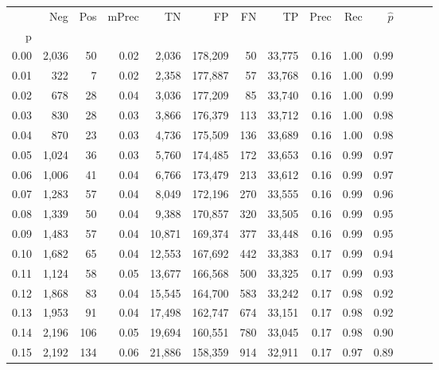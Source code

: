 \begin{tabular}{rrrrrrrrrrrrrr}
\toprule
{} &    Neg &  Pos & mPrec &       TN &       FP &      FN &      TP &  Prec &   Rec & $\hat{p}$ \\
p    &        &      &       &          &          &         &         &       &       &           \\
\midrule
0.00 &  2,036 &   50 &  0.02 &    2,036 &  178,209 &      50 &  33,775 &  0.16 &  1.00 &      0.99 \\
0.01 &    322 &    7 &  0.02 &    2,358 &  177,887 &      57 &  33,768 &  0.16 &  1.00 &      0.99 \\
0.02 &    678 &   28 &  0.04 &    3,036 &  177,209 &      85 &  33,740 &  0.16 &  1.00 &      0.99 \\
0.03 &    830 &   28 &  0.03 &    3,866 &  176,379 &     113 &  33,712 &  0.16 &  1.00 &      0.98 \\
0.04 &    870 &   23 &  0.03 &    4,736 &  175,509 &     136 &  33,689 &  0.16 &  1.00 &      0.98 \\
0.05 &  1,024 &   36 &  0.03 &    5,760 &  174,485 &     172 &  33,653 &  0.16 &  0.99 &      0.97 \\
0.06 &  1,006 &   41 &  0.04 &    6,766 &  173,479 &     213 &  33,612 &  0.16 &  0.99 &      0.97 \\
0.07 &  1,283 &   57 &  0.04 &    8,049 &  172,196 &     270 &  33,555 &  0.16 &  0.99 &      0.96 \\
0.08 &  1,339 &   50 &  0.04 &    9,388 &  170,857 &     320 &  33,505 &  0.16 &  0.99 &      0.95 \\
0.09 &  1,483 &   57 &  0.04 &   10,871 &  169,374 &     377 &  33,448 &  0.16 &  0.99 &      0.95 \\
0.10 &  1,682 &   65 &  0.04 &   12,553 &  167,692 &     442 &  33,383 &  0.17 &  0.99 &      0.94 \\
0.11 &  1,124 &   58 &  0.05 &   13,677 &  166,568 &     500 &  33,325 &  0.17 &  0.99 &      0.93 \\
0.12 &  1,868 &   83 &  0.04 &   15,545 &  164,700 &     583 &  33,242 &  0.17 &  0.98 &      0.92 \\
0.13 &  1,953 &   91 &  0.04 &   17,498 &  162,747 &     674 &  33,151 &  0.17 &  0.98 &      0.92 \\
0.14 &  2,196 &  106 &  0.05 &   19,694 &  160,551 &     780 &  33,045 &  0.17 &  0.98 &      0.90 \\
0.15 &  2,192 &  134 &  0.06 &   21,886 &  158,359 &     914 &  32,911 &  0.17 &  0.97 &      0.89 \\

\end{tabular}
